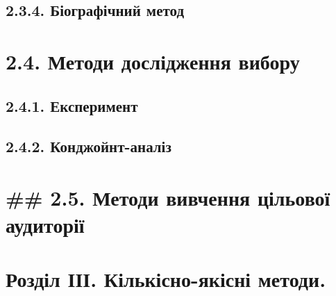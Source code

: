 \documentclass[
  10pt,
  a5paper,
  DIV=11,
  numbers=noendperiod]{scrreprt}
\begin{document}
\subsection*{2.3.4. Біографічний
метод}\label{ux431ux456ux43eux433ux440ux430ux444ux456ux447ux43dux438ux439-ux43cux435ux442ux43eux434}

\section*{2.4. Методи дослідження
вибору}\label{ux43cux435ux442ux43eux434ux438-ux434ux43eux441ux43bux456ux434ux436ux435ux43dux43dux44f-ux432ux438ux431ux43eux440ux443}


\subsection*{2.4.1.
Експеримент}\label{ux435ux43aux441ux43fux435ux440ux438ux43cux435ux43dux442}

\subsection*{2.4.2.
Конджойнт-аналіз}\label{ux43aux43eux43dux434ux436ux43eux439ux43dux442-ux430ux43dux430ux43bux456ux437-1}

\section*{\#\# 2.5. Методи вивчення цільової
аудиторії}\label{ux43cux435ux442ux43eux434ux438-ux432ux438ux432ux447ux435ux43dux43dux44f-ux446ux456ux43bux44cux43eux432ux43eux457-ux430ux443ux434ux438ux442ux43eux440ux456ux457}


\section*{Розділ ІІІ. Кількісно-якісні
методи.}\label{ux440ux43eux437ux434ux456ux43b-ux456ux456ux456.-ux43aux456ux43bux44cux43aux456ux441ux43dux43e-ux44fux43aux456ux441ux43dux456-ux43cux435ux442ux43eux434ux438.}
\end{document}
